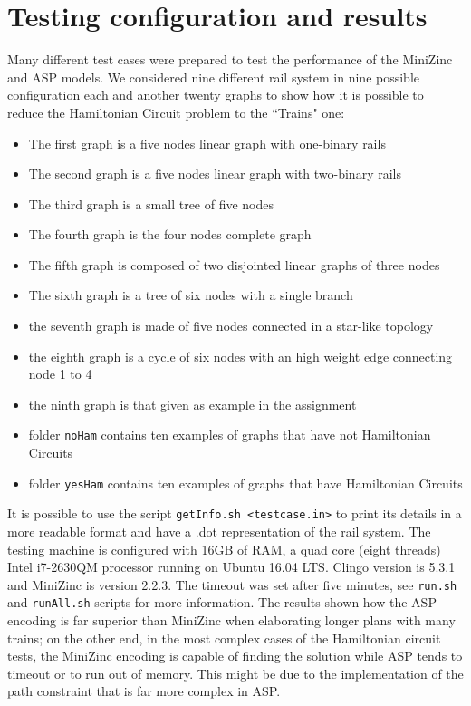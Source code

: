 \documentclass[11pt]{article}
\begin{document}
\section{Testing configuration and results}
Many different test cases were prepared to test the performance of the MiniZinc and ASP models. We considered nine different rail system in 
nine possible configuration each and another twenty graphs to show how it is possible to reduce the Hamiltonian Circuit problem to 
the ``Trains" one:
\begin{itemize}
\item The first graph is a five nodes linear graph with one-binary rails
\item The second graph is a five nodes linear graph with two-binary rails
\item The third graph is a small tree of five nodes
\item The fourth graph is the four nodes complete graph
\item The fifth graph is composed of two disjointed linear graphs of three nodes
\item The sixth graph is a tree of six nodes with a single branch
\item the seventh graph is made of five nodes connected in a star-like topology
\item the eighth graph is a cycle of six nodes with an high weight edge connecting node 1 to 4
\item the ninth graph is that given as example in the assignment
\item folder \verb+noHam+ contains ten examples of graphs that have not Hamiltonian Circuits
\item folder \verb+yesHam+ contains ten examples of graphs that have Hamiltonian Circuits
\end{itemize}
It is possible to use the script \verb+getInfo.sh <testcase.in>+ to print its details in a more readable format and have a .dot 
representation of the rail system.  
The testing machine is configured with 16GB of RAM, a quad core (eight threads) Intel i7-2630QM processor running on Ubuntu 16.04 LTS. 
Clingo version is 5.3.1 and MiniZinc is version 2.2.3. The timeout was set after five minutes, see \verb+run.sh+ and \verb+runAll.sh+
scripts for more information.
The results shown how the ASP encoding is far superior than MiniZinc when elaborating longer plans with many trains; on the other 
end, in the most complex cases of the Hamiltonian circuit tests, the MiniZinc encoding is capable of finding the solution while
ASP tends to timeout or to run out of memory. This might be due to the implementation of the path constraint that is far more 
complex in ASP.
\end{document}
